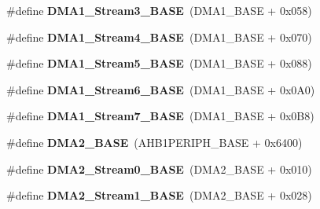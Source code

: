 \begin{DoxyCompactItemize}
\item 
\#define {\bfseries D\+M\+A1\+\_\+\+Stream3\+\_\+\+B\+A\+SE}~(D\+M\+A1\+\_\+\+B\+A\+SE + 0x058)\hypertarget{group___peripheral__memory__map_gac51deb54ff7cfe1290dfcf517ae67127}{}\label{group___peripheral__memory__map_gac51deb54ff7cfe1290dfcf517ae67127}

\item 
\#define {\bfseries D\+M\+A1\+\_\+\+Stream4\+\_\+\+B\+A\+SE}~(D\+M\+A1\+\_\+\+B\+A\+SE + 0x070)\hypertarget{group___peripheral__memory__map_ga757a3c0d866c0fe68c6176156065a26b}{}\label{group___peripheral__memory__map_ga757a3c0d866c0fe68c6176156065a26b}

\item 
\#define {\bfseries D\+M\+A1\+\_\+\+Stream5\+\_\+\+B\+A\+SE}~(D\+M\+A1\+\_\+\+B\+A\+SE + 0x088)\hypertarget{group___peripheral__memory__map_ga0ded7bed8969fe2e2d616e7f90eb7654}{}\label{group___peripheral__memory__map_ga0ded7bed8969fe2e2d616e7f90eb7654}

\item 
\#define {\bfseries D\+M\+A1\+\_\+\+Stream6\+\_\+\+B\+A\+SE}~(D\+M\+A1\+\_\+\+B\+A\+SE + 0x0\+A0)\hypertarget{group___peripheral__memory__map_ga58998ddc40adb6361704d6c9dad08125}{}\label{group___peripheral__memory__map_ga58998ddc40adb6361704d6c9dad08125}

\item 
\#define {\bfseries D\+M\+A1\+\_\+\+Stream7\+\_\+\+B\+A\+SE}~(D\+M\+A1\+\_\+\+B\+A\+SE + 0x0\+B8)\hypertarget{group___peripheral__memory__map_ga82186dd6d3f60995d428b34c041919d7}{}\label{group___peripheral__memory__map_ga82186dd6d3f60995d428b34c041919d7}

\item 
\#define {\bfseries D\+M\+A2\+\_\+\+B\+A\+SE}~(A\+H\+B1\+P\+E\+R\+I\+P\+H\+\_\+\+B\+A\+SE + 0x6400)\hypertarget{group___peripheral__memory__map_gab72a9ae145053ee13d1d491fb5c1df64}{}\label{group___peripheral__memory__map_gab72a9ae145053ee13d1d491fb5c1df64}

\item 
\#define {\bfseries D\+M\+A2\+\_\+\+Stream0\+\_\+\+B\+A\+SE}~(D\+M\+A2\+\_\+\+B\+A\+SE + 0x010)\hypertarget{group___peripheral__memory__map_gac4c67b24726ba6b94d03adb351bcec4d}{}\label{group___peripheral__memory__map_gac4c67b24726ba6b94d03adb351bcec4d}

\item 
\#define {\bfseries D\+M\+A2\+\_\+\+Stream1\+\_\+\+B\+A\+SE}~(D\+M\+A2\+\_\+\+B\+A\+SE + 0x028)\hypertarget{group___peripheral__memory__map_ga35512bdc3f5e9df4557c2fbe7935d0b1}{}\label{group___peripheral__memory__map_ga35512bdc3f5e9df4557c2fbe7935d0b1}


\end{DoxyCompactItemize}
